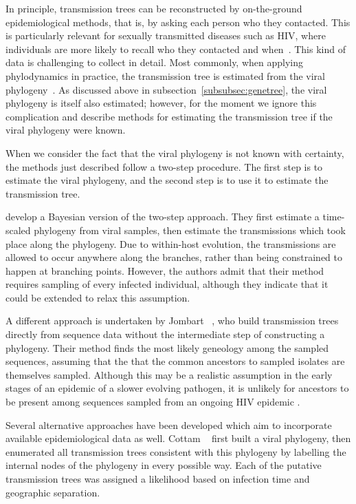 In principle, transmission trees can be reconstructed by on-the-ground
epidemiological methods, that is, by asking each person who they contacted.
This is particularly relevant for sexually transmitted diseases such as HIV,
where individuals are more likely to recall who they contacted and
when~\autocite{klovdahl1985social}. This kind of data is challenging to collect
in detail. Most commonly, when applying phylodynamics in practice, the
transmission tree is estimated from the viral
phylogeny~\autocite{volz2013viral}. As discussed above in
subsection~\ref{subsubsec:genetree}, the viral phylogeny is itself also estimated;
however, for the moment we ignore this complication and describe methods for
estimating the transmission tree if the viral phylogeny were known.

When we consider the fact that the viral phylogeny is not known with certainty,
the methods just described follow a two-step procedure. The first step is to
estimate the viral phylogeny, and the second step is to use it to estimate the
transmission tree.

\autocite{didelot2014bayesian} develop a Bayesian version of the two-step
approach. They first estimate a time-scaled phylogeny from viral samples, then
estimate the transmissions which took place along the phylogeny. Due to
within-host evolution, the transmissions are allowed to occur anywhere along
the branches, rather than being constrained to happen at branching points.
However, the authors admit that their method requires sampling of every
infected individual, although they indicate that it could be extended to relax
this assumption.

A different approach is undertaken by Jombart
\etal~\autocite{jombart2011reconstructing}, who build transmission trees
directly from sequence data without the intermediate step of constructing a
phylogeny. Their method finds the most likely geneology among the sampled
sequences, assuming that the that the common ancestors to sampled isolates are
themselves sampled. Although this may be a realistic assumption in the early
stages of an epidemic of a slower evolving pathogen, it is unlikely for
ancestors to be present among sequences sampled from an ongoing HIV epidemic
.

Several alternative approaches have been developed which aim to
incorporate available epidemiological data as well. Cottam
\etal~\autocite{cottam2008integrating} first built a viral phylogeny, then
enumerated all transmission trees consistent with this phylogeny by labelling
the internal nodes of the phylogeny in every possible way. Each of the putative
transmission trees was assigned a likelihood based on infection time and
geographic separation. 



